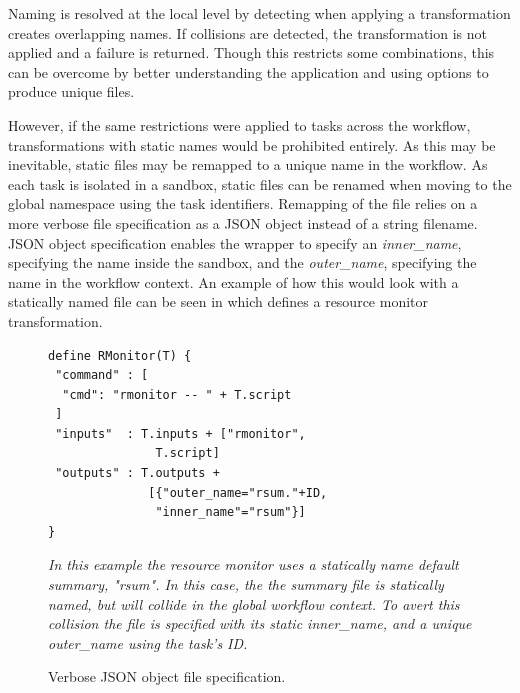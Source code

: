 \documentclass[conference]{IEEEtran}
\begin{document}
Naming is resolved at the local level by detecting
when applying a transformation 
creates overlapping names.
If collisions are detected, the 
transformation is not applied and
a failure is returned.
Though this restricts some combinations, 
this can be overcome by 
better understanding the application
and using options to 
produce unique files.


However, if the same restrictions were
applied to tasks across the workflow,
transformations with static names would
be prohibited entirely.
As this may be inevitable,
static files may be remapped
to a unique name in the workflow.
As each task is isolated in a sandbox, 
static files can be renamed when moving to the 
global namespace using the task identifiers. 
Remapping of the file relies on
a more verbose file specification as
a JSON object instead of a string filename.
JSON object specification enables the wrapper
to specify an \emph{inner\_name}, 
specifying the name inside the sandbox,
and the \emph{outer\_name},
specifying the name in the workflow context. 
An example of how this would look with
a statically named file can be seen in 
 which defines a resource
monitor transformation.

\begin{figure}[h]
\begin{framed}
\small
\begin{verbatim}
define RMonitor(T) {
 "command" : [
  "cmd": "rmonitor -- " + T.script
 ]
 "inputs"  : T.inputs + ["rmonitor",
               T.script]
 "outputs" : T.outputs +
              [{"outer_name="rsum."+ID, 
               "inner_name"="rsum"}]
}
\end{verbatim}
\end{framed}
\caption{Verbose JSON object file specification.} 
\small
\emph{In this example the resource monitor uses
a statically name default summary, "rsum".
In this case, the the summary 
file is statically named, but will collide in
the global workflow context. To avert this
collision the file is specified with its 
static inner\_name, and a unique outer\_name
using the task's ID.}
\label{json-file}
\end{figure}
\end{document}
